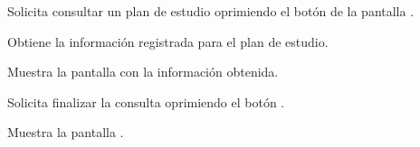 \begin{UCtrayectoria}
	\UCpaso [\UCactor] Solicita consultar un plan de estudio oprimiendo el botón  de la pantalla . 
	
	\UCpaso [\UCsist] Obtiene la información registrada para el plan de estudio.
			
	\UCpaso [\UCsist] Muestra la pantalla  con la información obtenida.
	
	\UCpaso [\UCactor] Solicita finalizar la consulta oprimiendo el botón . 
	
	\UCpaso [\UCsist] Muestra la pantalla .
	
\end{UCtrayectoria}

